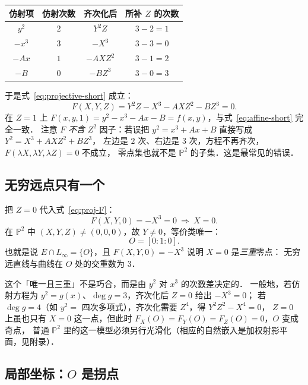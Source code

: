 \documentclass[10pt,a4paper]{article}
\numberwithin{equation}{section}
\begin{document}
\begin{center}
\begin{tabular}{c|c|c|c}
\hline
仿射项 & 仿射次数 & 齐次化后 & 所补 $Z$ 的次数\\
\hline
$y^{2}$ & $2$ & $Y^{2}Z$ & $3-2=1$\\
$-x^{3}$ & $3$ & $-X^{3}$ & $3-3=0$\\
$-Ax$ & $1$ & $-AXZ^{2}$ & $3-1=2$\\
$-B$ & $0$ & $-BZ^{3}$ & $3-0=3$\\
\hline
\end{tabular}
\end{center}

于是式~\eqref{eq:projective-short} 成立：
\begin{equation}\label{eq:proj-F}
F(X,Y,Z)=Y^{2}Z-X^{3}-AXZ^{2}-BZ^{3}=0 .
\end{equation}
在 $Z=1$ 上 $F(x,y,1)=y^{2}-x^{3}-Ax-B=f(x,y)$，与式~\eqref{eq:affine-short} 完全一致．
注意 $F$ \emph{不含} $Z^{2}$ 因子：若误把 $y^{2}=x^{3}+Ax+B$ 直接写成 $Y^{2}=X^{3}+AXZ^{2}+BZ^{3}$，
左边是 $2$ 次、右边是 $3$ 次，方程不再齐次，$F(\lambda X,\lambda Y,\lambda Z)=0$ 不成立，
零点集也就不是 $\mathbb P^{2}$ 的子集．这是最常见的错误．

\subsection{无穷远点只有一个}

把 $Z=0$ 代入式~\eqref{eq:proj-F}：
\[
F(X,Y,0)=-X^{3}=0\ \Longrightarrow\ X=0 .
\]
在 $\mathbb P^{2}$ 中 $(X,Y,Z)\neq(0,0,0)$，故 $Y\neq0$，等价类唯一：
\begin{equation}\label{eq:O}
O=[0:1:0].
\end{equation}
也就是说 $\overline E\cap L_{\infty}=\{O\}$，且 $F(X,Y,0)=-X^{3}$ 说明 $X=0$ 是\emph{三重}零点：
无穷远直线与曲线在 $O$ 处的交重数为 $3$．

这个「唯一且三重」不是巧合，而是由 $y^{2}$ 对 $x^{3}$ 的次数差决定的．
一般地，若仿射方程为 $y^{2}=g(x)$、$\deg g=3$，齐次化后 $Z=0$ 给出 $-X^{3}=0$；
若 $\deg g=4$（如 $y^{2}=$ 四次多项式），齐次化需要 $Z^{4}$，得 $Y^{2}Z^{2}-X^{4}=0$，
$Z=0$ 上虽也只有 $X=0$ 这一点，但此时 $F_{X}(O)=F_{Y}(O)=F_{Z}(O)=0$，$O$ 变成奇点，
普通 $\mathbb P^{2}$ 里的这一模型必须另行光滑化（相应的自然嵌入是加权射影平面，见附录）．

\subsection{局部坐标：$O$ 是拐点}\label{sec:inflection}
\end{document}
